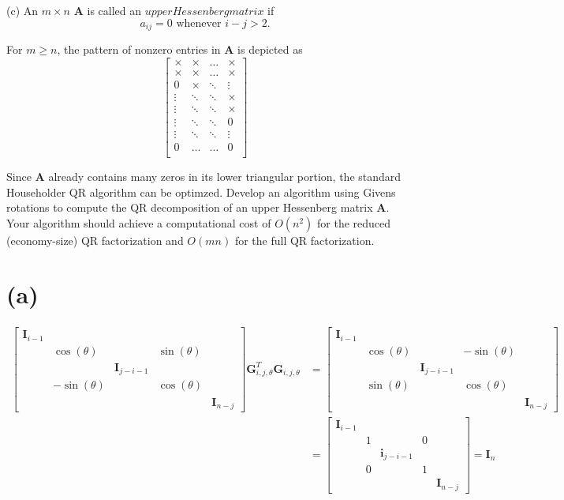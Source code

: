 \documentclass{article}
\begin{document}
(c) An \(m \times n\) \(\bm{A}\) is called an \(upper Hessenberg matrix\) if
\[
    a_{ij} = 0 \text{ whenever } i - j > 2.
\]

For \(m \geq n\), the pattern of nonzero entries in \(\bm{A}\) is depicted as
\[
\begin{bmatrix}
    \times & \times & \dots & \times \\
    \times & \times & \dots & \times \\
    0 & \times & \ddots & \vdots \\
    \vdots & \ddots & \ddots & \times \\
    \vdots & \ddots & \ddots & \times \\
    \vdots & \ddots & \ddots & 0 \\
    \vdots & \ddots & \ddots & \vdots \\
    0 & \dots & \dots & 0 \\
\end{bmatrix}
\]

Since \(\bm{A}\) already contains many zeros in its lower triangular portion, the standard Householder QR algorithm can be optimzed.
Develop an algorithm using Givens rotations to compute the QR decomposition of an upper Hessenberg matrix \(\bm{A}\). Your algorithm should achieve a computational cost of \(O(n^2)\) for the reduced (economy-size) QR factorization and \(O(mn)\) for the full QR factorization.


\section*{(a)}
\begin{align*}
    \begin{bmatrix}
        \bm{I}_{i-1} &  &  &  &  \\
                     & \cos(\theta) &  & \sin(\theta) & \\
                     & & \bm{I}_{j - i - 1}& & \\
         & -\sin(\theta) && \cos(\theta) &\\
         & &&& \bm{I}_{n-j}
    \end{bmatrix}
    \bm{G}_{i, j, \theta}^T \bm{G}_{i, j, \theta} &= \begin{bmatrix}
        \bm{I}_{i-1} &  &  &  &  \\
                     & \cos(\theta) &  & -\sin(\theta) & \\
                     & & \bm{I}_{j - i - 1}& & \\
         & \sin(\theta) && \cos(\theta) &\\
         & &&& \bm{I}_{n-j}
    \end{bmatrix} \\
    &= 
    \begin{bmatrix}
        \bm{I}_{i-1} &  &  &  &  \\
                     & 1 &  & 0 & \\
                     & & \bm{i}_{j - i - 1}& & \\
         & 0 && 1 &\\
         & &&& \bm{I}_{n-j}
    \end{bmatrix} = \bm{I}_n
\end{align*}
\end{document}
